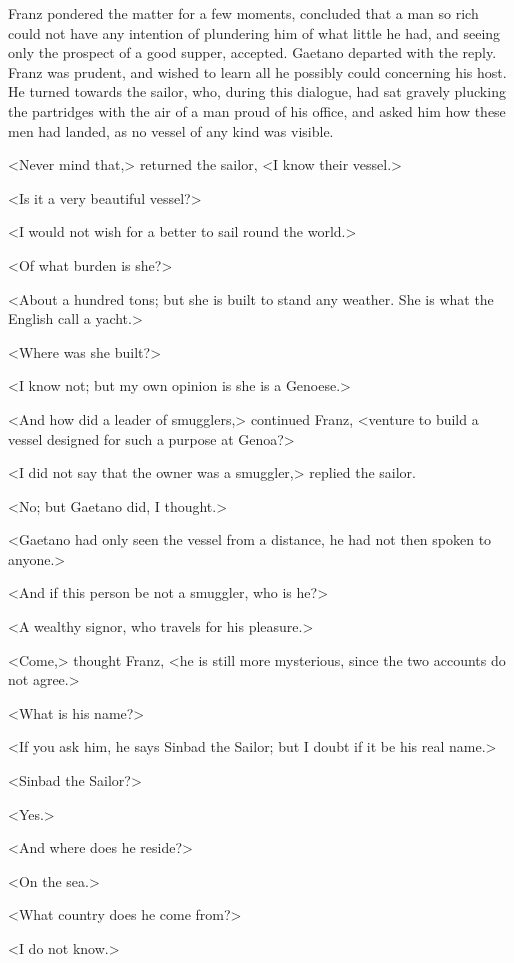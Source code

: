  Franz pondered the matter for a few moments, concluded that a man so rich could not have any intention of plundering him of what little he had, and seeing only the prospect of a good supper, accepted. Gaetano departed with the reply. Franz was prudent, and wished to learn all he possibly could concerning his host. He turned towards the sailor, who, during this dialogue, had sat gravely plucking the partridges with the air of a man proud of his office, and asked him how these men had landed, as no vessel of any kind was visible. 

 <Never mind that,> returned the sailor, <I know their vessel.> 

 <Is it a very beautiful vessel?> 

 <I would not wish for a better to sail round the world.> 

 <Of what burden is she?> 

 <About a hundred tons; but she is built to stand any weather. She is what the English call a yacht.> 

 <Where was she built?> 

 <I know not; but my own opinion is she is a Genoese.> 

 <And how did a leader of smugglers,> continued Franz, <venture to build a vessel designed for such a purpose at Genoa?> 

 <I did not say that the owner was a smuggler,> replied the sailor. 

 <No; but Gaetano did, I thought.> 

 <Gaetano had only seen the vessel from a distance, he had not then spoken to anyone.> 

 <And if this person be not a smuggler, who is he?> 

 <A wealthy signor, who travels for his pleasure.> 

 <Come,> thought Franz, <he is still more mysterious, since the two accounts do not agree.> 

 <What is his name?> 

 <If you ask him, he says Sinbad the Sailor; but I doubt if it be his real name.> 

 <Sinbad the Sailor?> 

 <Yes.> 

 <And where does he reside?> 

 <On the sea.> 

 <What country does he come from?> 

 <I do not know.> 


